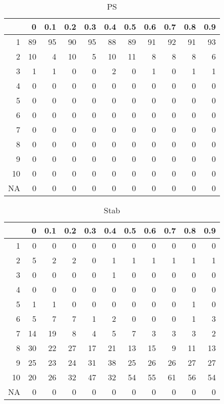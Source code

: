 \documentclass[11pt]{article}
\begin{document}
\begin{table}[H]
\centering
\begin{tabular}{rrrrrrrrrrr}
  \hline
 & 0 & 0.1 & 0.2 & 0.3 & 0.4 & 0.5 & 0.6 & 0.7 & 0.8 & 0.9 \\ 
  \hline
1 & 89 & 95 & 90 & 95 & 88 & 89 & 91 & 92 & 91 & 93 \\ 
  2 & 10 & 4 & 10 & 5 & 10 & 11 & 8 & 8 & 8 & 6 \\ 
  3 & 1 & 1 & 0 & 0 & 2 & 0 & 1 & 0 & 1 & 1 \\ 
  4 & 0 & 0 & 0 & 0 & 0 & 0 & 0 & 0 & 0 & 0 \\ 
  5 & 0 & 0 & 0 & 0 & 0 & 0 & 0 & 0 & 0 & 0 \\ 
  6 & 0 & 0 & 0 & 0 & 0 & 0 & 0 & 0 & 0 & 0 \\ 
  7 & 0 & 0 & 0 & 0 & 0 & 0 & 0 & 0 & 0 & 0 \\ 
  8 & 0 & 0 & 0 & 0 & 0 & 0 & 0 & 0 & 0 & 0 \\ 
  9 & 0 & 0 & 0 & 0 & 0 & 0 & 0 & 0 & 0 & 0 \\ 
  10 & 0 & 0 & 0 & 0 & 0 & 0 & 0 & 0 & 0 & 0 \\ 
  NA & 0 & 0 & 0 & 0 & 0 & 0 & 0 & 0 & 0 & 0 \\ 
   \hline
\end{tabular}
\caption{PS} 
\end{table}
\begin{table}[H]
\centering
\begin{tabular}{rrrrrrrrrrr}
  \hline
 & 0 & 0.1 & 0.2 & 0.3 & 0.4 & 0.5 & 0.6 & 0.7 & 0.8 & 0.9 \\ 
  \hline
1 & 0 & 0 & 0 & 0 & 0 & 0 & 0 & 0 & 0 & 0 \\ 
  2 & 5 & 2 & 2 & 0 & 1 & 1 & 1 & 1 & 1 & 1 \\ 
  3 & 0 & 0 & 0 & 0 & 1 & 0 & 0 & 0 & 0 & 0 \\ 
  4 & 0 & 0 & 0 & 0 & 0 & 0 & 0 & 0 & 0 & 0 \\ 
  5 & 1 & 1 & 0 & 0 & 0 & 0 & 0 & 0 & 1 & 0 \\ 
  6 & 5 & 7 & 7 & 1 & 2 & 0 & 0 & 0 & 1 & 3 \\ 
  7 & 14 & 19 & 8 & 4 & 5 & 7 & 3 & 3 & 3 & 2 \\ 
  8 & 30 & 22 & 27 & 17 & 21 & 13 & 15 & 9 & 11 & 13 \\ 
  9 & 25 & 23 & 24 & 31 & 38 & 25 & 26 & 26 & 27 & 27 \\ 
  10 & 20 & 26 & 32 & 47 & 32 & 54 & 55 & 61 & 56 & 54 \\ 
  NA & 0 & 0 & 0 & 0 & 0 & 0 & 0 & 0 & 0 & 0 \\ 
   \hline
\end{tabular}
\caption{Stab} 
\end{table}
\end{document}
